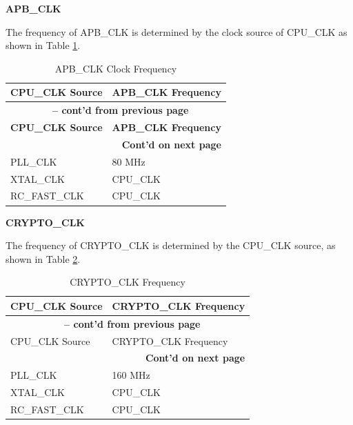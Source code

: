 \documentclass[main\_\_EN.tex]{subfiles}
\begin{document}
\textbf{APB\_CLK}

The frequency of APB\_CLK is determined by the clock source of CPU\_CLK as shown in Table  \ref{tab:resclk-apb-clk-freq}.

\begin{longtable}[c]{ |p{5cm}|p{5cm}| }
\caption{APB\_CLK Clock Frequency}\label{tab:resclk-apb-clk-freq}
\\\hline
    \rowcolor{lightgray}
        \textbf{CPU\_CLK Source} & \textbf{APB\_CLK Frequency} \\
        \hline
        \endfirsthead

        \multicolumn{2}{c}{\bfseries \tablename\ \thetable{} -- cont'd from previous page}\\\hline

        \rowcolor{lightgray}
        \textbf{CPU\_CLK Source} & \textbf{APB\_CLK Frequency}\\
        \hline
        \endhead
        \multicolumn{2}{r}{\textbf{Cont'd on next page}} \\
        \endfoot
        \endlastfoot
        \hline
        PLL\_CLK & 80 MHz \\
        \hline
        XTAL\_CLK & CPU\_CLK \\
        \hline
        RC\_FAST\_CLK & CPU\_CLK \\
        \hline
\end{longtable}


\textbf{CRYPTO\_CLK }

The frequency of CRYPTO\_CLK is determined by the CPU\_CLK source, as shown in Table  \ref{tab:resclk-crypto-clk-freq}.

 \begin{longtable}[c]{ |p{5cm}|p{5.5cm}| }
      \caption{CRYPTO\_CLK Frequency}
    \label{tab:resclk-crypto-clk-freq} \\
        \hline
        \rowcolor{lightgray}
        \textbf{CPU\_CLK Source} & \textbf{CRYPTO\_CLK Frequency} \\
        \hline
        \endfirsthead
        \multicolumn{2}{c}{\bfseries \tablename\ \thetable{} -- cont'd from previous page}\\\hline
        \rowcolor{lightgray}
        CPU\_CLK Source & CRYPTO\_CLK Frequency \\
        \hline
        \endhead
        \multicolumn{2}{r}{\textbf{Cont'd on next page}} \\
        \endfoot
        \endlastfoot
        \hline
        PLL\_CLK & 160 MHz \\
        \hline
        XTAL\_CLK & CPU\_CLK \\
        \hline
        RC\_FAST\_CLK & CPU\_CLK \\
        \hline
\end{longtable}
\end{document}

